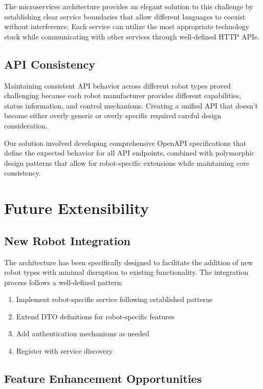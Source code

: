 \documentclass[runningheads]{llncs}
\begin{document}
The microservices architecture provides an elegant solution to this challenge by establishing clear service boundaries that allow different languages to coexist without interference. Each service can utilize the most appropriate technology stack while communicating with other services through well-defined HTTP APIs.

\subsection{API Consistency}

Maintaining consistent API behavior across different robot types proved challenging because each robot manufacturer provides different capabilities, status information, and control mechanisms. Creating a unified API that doesn't become either overly generic or overly specific required careful design consideration.

Our solution involved developing comprehensive OpenAPI specifications that define the expected behavior for all API endpoints, combined with polymorphic design patterns that allow for robot-specific extensions while maintaining core consistency.

\section{Future Extensibility}

\subsection{New Robot Integration}

The architecture has been specifically designed to facilitate the addition of new robot types with minimal disruption to existing functionality. The integration process follows a well-defined pattern:

\begin{enumerate}
    \item Implement robot-specific service following established patterns
    \item Extend DTO definitions for robot-specific features
    \item Add authentication mechanisms as needed
    \item Register with service discovery
\end{enumerate}

\subsection{Feature Enhancement Opportunities}
\end{document}
